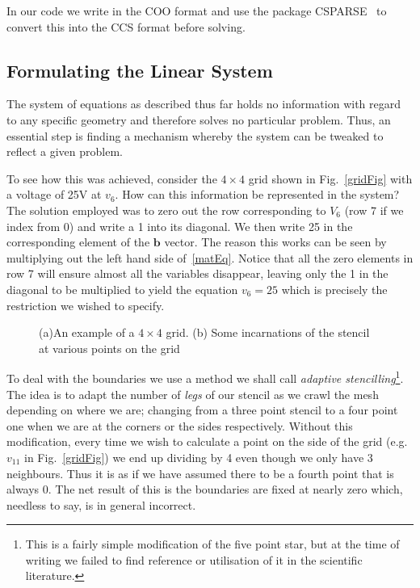 \documentclass[a4paper]{article}
\newcommand{\vect}[1]{\bm{#1}}
\begin{document}
In our code we write in the COO format and use the package
CSPARSE~\cite{csparse} to convert this into the CCS format before solving.

\subsection{Formulating the Linear System}
The system of equations as described thus far holds no information with regard
to any specific geometry and therefore solves no particular problem. Thus, an
essential step is finding a mechanism whereby the system can be tweaked to
reflect a given problem.

To see how this was achieved, consider the $4 \times 4$ grid shown
in Fig.~\ref{gridFig} with a voltage of 25V at $v_6$. How can this information
be represented in the system? The solution employed was to zero out the row
corresponding to $V_6$ (row 7 if we index from 0) and write a 1 into its
diagonal. We then write 25 in the corresponding element of the $\vect{b}$
vector. The reason this works can be seen by multiplying out the left hand side
of~\eqref{matEq}. Notice that all the zero elements in row 7 will ensure almost
all the variables disappear, leaving only the 1 in the diagonal to be
multiplied to yield the equation $v_6=25$ which is precisely the restriction we
wished to specify.
\begin{figure}
  \centering
{}
  \hfill
  \caption{(a)An example of a $4 \times 4$ grid. (b) Some incarnations of the 
stencil at various points on the grid}
\end{figure}

To deal with the boundaries we use a method we shall call \emph{adaptive
stencilling}\footnote{This is a fairly simple modification of the five point
star, but at the time of writing we failed to find reference or utilisation of
it in the scientific literature.}. The idea is to adapt the number of
\emph{legs} of our stencil as we crawl the mesh depending on where we are;
changing from a three point stencil to a four point one when we are at the
corners or the sides respectively. Without this modification, every time we
wish to calculate a point on the side of the grid (e.g. $v_{11}$ in
Fig.~\ref{gridFig}) we end up dividing by 4 even though we only have 3
neighbours. Thus it is as if we have assumed there to be a fourth point that is
always 0. The net result of this is the boundaries are fixed at nearly zero
which, needless to say, is in general incorrect.
\end{document}
